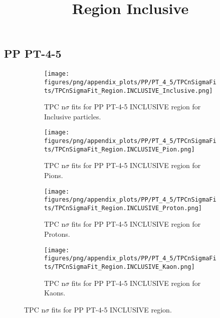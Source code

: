             \subsection{PP PT-4-5}
            \begin{figure}[H]
                \title{Region Inclusive}
                \begin{subfigure}[b]{0.5\textwidth}
                    \centering
                    \texttt{[image: figures/png/appendix\_plots/PP/PT\_4\_5/TPCnSigmaFits/TPCnSigmaFit\_Region.INCLUSIVE\_Inclusive.png]}
                    \caption{TPC n$\sigma$ fits for PP PT-4-5 INCLUSIVE region for Inclusive particles.}
                    \label{fig:appendix_PP_PT-4-5_INCLUSIVE_Inclusive}
                \end{subfigure}
                \begin{subfigure}[b]{0.5\textwidth}
                    \centering
                    \texttt{[image: figures/png/appendix\_plots/PP/PT\_4\_5/TPCnSigmaFits/TPCnSigmaFit\_Region.INCLUSIVE\_Pion.png]}
                    \caption{TPC n$\sigma$ fits for PP PT-4-5 INCLUSIVE region for Pions.}
                    \label{fig:appendix_PP_PT-4-5_INCLUSIVE_Pion}
                \end{subfigure}
                \begin{subfigure}[b]{0.5\textwidth}
                    \centering
                    \texttt{[image: figures/png/appendix\_plots/PP/PT\_4\_5/TPCnSigmaFits/TPCnSigmaFit\_Region.INCLUSIVE\_Proton.png]}
                    \caption{TPC n$\sigma$ fits for PP PT-4-5 INCLUSIVE region for Protons.}
                    \label{fig:appendix_PP_PT-4-5_INCLUSIVE_Proton}
                \end{subfigure}
                \begin{subfigure}[b]{0.5\textwidth}
                    \centering
                    \texttt{[image: figures/png/appendix\_plots/PP/PT\_4\_5/TPCnSigmaFits/TPCnSigmaFit\_Region.INCLUSIVE\_Kaon.png]}
                    \caption{TPC n$\sigma$ fits for PP PT-4-5 INCLUSIVE region for Kaons.}
                    \label{fig:appendix_PP_PT-4-5_INCLUSIVE_Kaon}
                \end{subfigure}
                \caption{TPC n$\sigma$ fits for PP PT-4-5 INCLUSIVE region.}
                \label{fig:appendix_PP_PT-4-5_INCLUSIVE}
            \end{figure}
